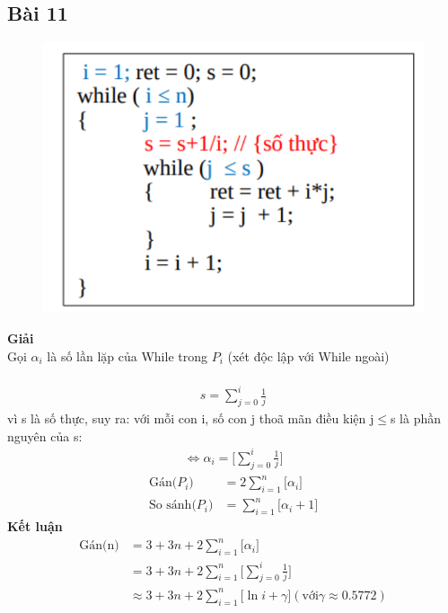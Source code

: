 \documentclass[10pt,a4paper]{article}
\begin{document}
\subsection*{Bài 11} %
    \begin{figure}[H]
        \centering\includegraphics[scale=.6]{images/Bai11.png} \\
    \end{figure}
    \textbf{Giải} \\
     Gọi $\alpha_i$ là số lần lặp của While trong $P_i$ (xét độc lập với While ngoài)
    \\ \\
    \begin{align*}
        s =  \sum_{j=0}^{i}\frac{1}{j}
    \end{align*}
    vì s là số thực, suy ra: với mỗi con i, số con j thoã mãn điều kiện j$\leq$s  là phần nguyên của s:\\
    \begin{align*}
        \Leftrightarrow \alpha_i = \big[\sum_{j=0}^{i}\frac{1}{j}\big]
    \end{align*}
    \begin{align*}
        \text{Gán($P_i$)}
        & = 2\sum_{i=1}^{n}\big[\alpha_i\big]\\
        \text{So sánh($P_i$)}
        & = \sum_{i=1}^{n}\big[\alpha_i+1\big]
    \end{align*}
    \textbf{Kết luận}
    \begin{align*}
        \text{Gán(n)}
        & = 3 + 3n + 2\sum_{i=1}^{n}\big[\alpha_i\big]\\
        & = 3 + 3n + 2\sum_{i=1}^{n}\big[\sum_{j=0}^{i}\frac{1}{j}\big]\\
        & \approx 3 + 3n + 2\sum_{i=1}^{n}\big[\ln{i}+ \gamma\big] (\text{với} \gamma \approx 0.5772)\\
    \end{align*}
\end{document}
